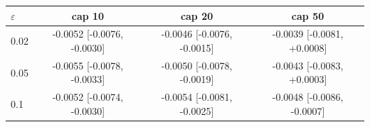 \begin{tabular}{lccc}
\toprule
$\varepsilon$ & cap 10 & cap 20 & cap 50 \\
\midrule
0.02 & -0.0052 [-0.0076, -0.0030] & -0.0046 [-0.0076, -0.0015] & -0.0039 [-0.0081, +0.0008] \\
0.05 & -0.0055 [-0.0078, -0.0033] & -0.0050 [-0.0078, -0.0019] & -0.0043 [-0.0083, +0.0003] \\
0.1 & -0.0052 [-0.0074, -0.0030] & -0.0054 [-0.0081, -0.0025] & -0.0048 [-0.0086, -0.0007] \\
\bottomrule
\end{tabular}
